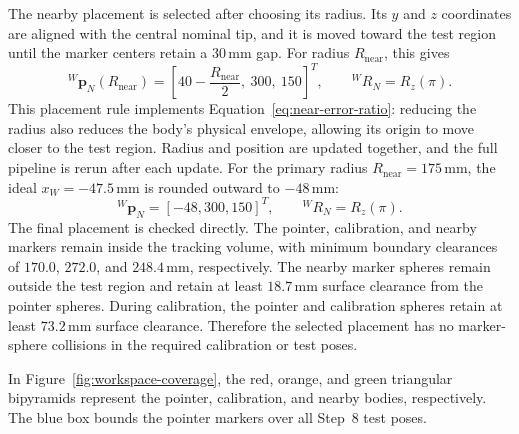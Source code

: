 \documentclass[11pt]{article}
\newcommand{\vct}[1]{\bm{#1}}
\begin{document}
The nearby placement is selected after choosing its radius.  Its $y$ and $z$
coordinates are aligned with the central nominal tip, and it is moved toward
the test region until the marker centers retain a $30\,\mathrm{mm}$ gap.  For
radius $R_{\mathrm{near}}$, this gives
\begin{equation}
{}^W\vct p_N(R_{\mathrm{near}})
=\left[40-\frac{R_{\mathrm{near}}}{2},\ 300,\ 150\right]^T,
\qquad {}^WR_N=R_z(\pi).
\label{eq:iterated-near-placement}
\end{equation}
This placement rule implements Equation~\ref{eq:near-error-ratio}: reducing the
radius also reduces the body's physical envelope, allowing its origin to move
closer to the test region.  Radius and position are updated together, and the
full pipeline is rerun after each update.  For the primary radius
$R_{\mathrm{near}}=175\,\mathrm{mm}$, the ideal $x_W=-47.5\,\mathrm{mm}$ is
rounded outward to $-48\,\mathrm{mm}$:
\begin{equation}
\boxed{{}^W\vct p_N=[-48,300,150]^T,
\qquad {}^WR_N=R_z(\pi).}
\label{eq:selected-near-placement}
\end{equation}
The final placement is checked directly.  The pointer, calibration, and nearby
markers remain inside the tracking volume, with minimum boundary clearances of
$170.0$, $272.0$, and $248.4\,\mathrm{mm}$, respectively.  The nearby marker
spheres remain outside the test region and retain at least
$18.7\,\mathrm{mm}$ surface clearance from the pointer spheres.  During
calibration, the pointer and calibration spheres retain at least
$73.2\,\mathrm{mm}$ surface clearance.  Therefore the selected placement has
no marker-sphere collisions in the required calibration or test poses.

In Figure~\ref{fig:workspace-coverage}, the red, orange, and green triangular
bipyramids represent the pointer, calibration, and nearby bodies,
respectively.  The blue box bounds the pointer markers over all Step~8 test
poses.
\end{document}
